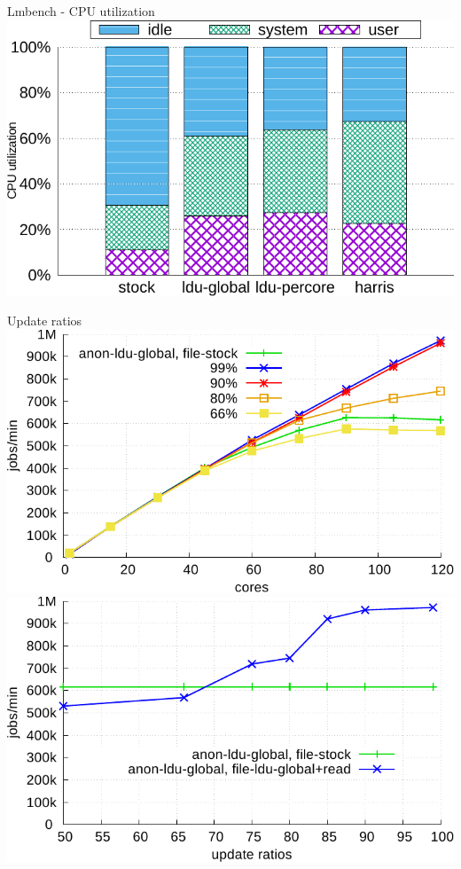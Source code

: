 \documentclass[english]{beamer} %
\begin{document}
\begin{frame}{Lmbench - CPU utilization}
\includegraphics[scale=0.8]{graph/lmbench_cpuutils}
\end{frame}


\begin{frame}{Update ratios}
\includegraphics[scale=0.4]{graph/ratio_aim7_core}
\includegraphics[scale=0.4]{graph/ratio_aim7}
\end{frame}
\end{document}
